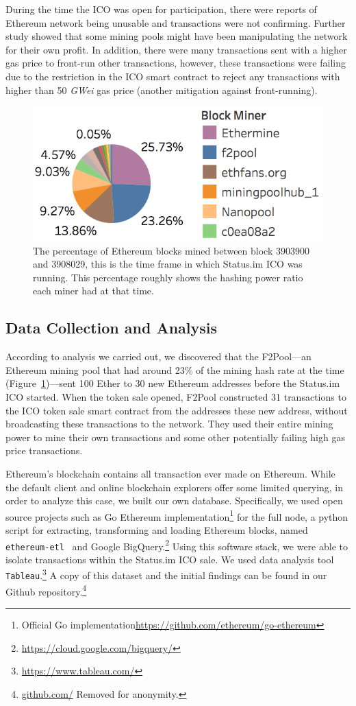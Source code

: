 During the time the ICO was open for participation, there were reports of Ethereum network being unusable and transactions were not confirming. Further study showed that some mining pools might have been manipulating the network for their own profit. In addition, there were many transactions sent with a higher gas price to front-run other transactions, however, these transactions were failing due to the restriction in the ICO smart contract to reject any transactions with higher than 50 \textit{GWei} gas price (another mitigation against front-running).

\begin{figure}[t]
\centering
\includegraphics[width=0.5\linewidth]{figures/Mining_pool_ratio.png}
\caption{\scriptsize The percentage of Ethereum blocks mined between block 3903900 and 3908029, this is the time frame in which Status.im ICO was running. This percentage roughly shows the hashing power ratio each miner had at that time. \label{fig:mining_pool_ratio}} %
\end{figure}

\subsection{Data Collection and Analysis}
According to analysis we carried out, we discovered that the F2Pool---an Ethereum mining pool that had around 23\% of the mining hash rate at the time (Figure~\ref{fig:mining_pool_ratio})---sent 100 Ether to 30 new Ethereum addresses before the Status.im ICO started. When the token sale opened, F2Pool constructed 31 transactions to the ICO token sale smart contract from the addresses these new address, without broadcasting these transactions to the network. They used their entire mining power to mine their own transactions and some other potentially failing high gas price transactions.

Ethereum's blockchain contains all transaction ever made on Ethereum. While the default client and online blockchain explorers offer some limited querying, in order to analyze this case, we built our own database. Specifically, we used open source projects such as Go Ethereum implementation\footnote{Official Go implementation\url{https://github.com/ethereum/go-ethereum}} for the full node, a python script for extracting, transforming and loading Ethereum blocks, named \texttt{ethereum-etl}~\cite{ethereumetl} and Google BigQuery.\footnote{\url{https://cloud.google.com/bigquery/}} Using this software stack, we were able to isolate transactions within the Status.im ICO sale. We used data analysis tool \texttt{Tableau}.\footnote{\url{https://www.tableau.com/}} A copy of this dataset and the initial findings can be found in our Github repository.\footnote{\url{github.com/} Removed for anonymity.}

